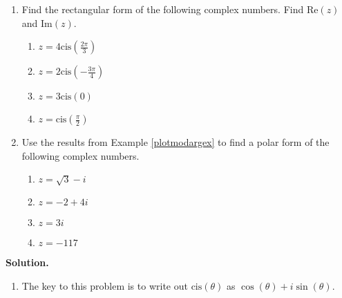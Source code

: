 \documentclass{ximera}
\begin{document}
\begin{ex} \label{polarcomplexex} $~$

\begin{enumerate}

\item Find the rectangular form of the following complex numbers. Find $\text{Re}(z)$ and $\text{Im}(z)$.

\begin{multicols}{4}

\begin{enumerate}

\item  $z = 4 \text{cis}\left(\frac{2\pi}{3}\right)$

\item  $z = 2 \text{cis}\left(-\frac{3\pi}{4}\right)$

\item  $z = 3 \text{cis}(0)$

\item  $z = \text{cis}\left(\frac{\pi}{2}\right)$

\end{enumerate}

\end{multicols}

\item  Use the results from Example \ref{plotmodargex} to find a polar form of the following complex numbers.

\begin{multicols}{4}

\begin{enumerate}

\item  $z = \sqrt{3}-i$

\item  $z = -2+4i$

\item  $z = 3i$

\item  $z = -117$

\end{enumerate}

\end{multicols}



\end{enumerate}


{\bf Solution.} 

\begin{enumerate}


\item The key to this problem is to write out $\text{cis}(\theta)$ as $\cos(\theta) + i\sin(\theta)$.


\end{enumerate}
\end{ex}
\end{document}
